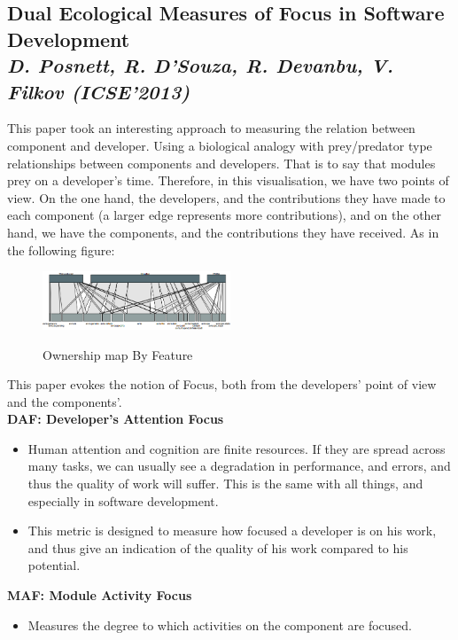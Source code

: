 \subsection{Dual Ecological Measures of Focus in Software Development\\ \textit{D. Posnett, R. D’Souza, R. Devanbu, V. Filkov (ICSE'2013)}}

This paper took an interesting approach to measuring the relation between component and developer. Using a biological analogy with prey/predator type relationships between components and developers\cite{Posnett}. That is to say that modules prey on a developer's time. Therefore, in this visualisation, we have two points of view. On the one hand, the developers, and the contributions they have made to each component (a larger edge represents more contributions), and on the other hand, we have the components, and the contributions they have received. As in the following figure:

\begin{figure}[H]
\centering
\includegraphics[width=0.5\textwidth]{./resources/focus.png}~
\caption{Ownership map By Feature}
\label{fig:ownership_map_by_feature}
\end{figure}

This paper evokes the notion of Focus, both from the developers' point of view and the components'.
\\[0.4cm]
\textbf{DAF: Developer’s Attention Focus}
\begin{itemize}
\item Human attention and cognition are finite resources. If they are spread across many tasks, we can usually see a degradation in performance, and errors, and thus the quality of work will suffer. This is the same with all things, and especially in software development.
\item This metric is designed to measure how focused a developer is on his work, and thus give an indication of the quality of his work compared to his potential.
\end{itemize}

\textbf{MAF: Module Activity Focus}
\begin{itemize}
\item Measures the degree to which activities on the component are focused.
\end{itemize}

